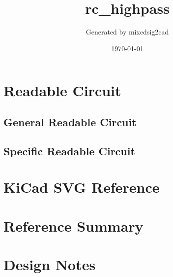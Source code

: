 \documentclass[11pt]{article}
\title{rc\_highpass}
\author{Generated by mixedsig2cad}
\date{\today}
\begin{document}
\maketitle
\section{Readable Circuit}
\subsection{General Readable Circuit}

\subsection{Specific Readable Circuit}

\section{KiCad SVG Reference}
\section{Reference Summary}

\section{Design Notes}

\end{document}
